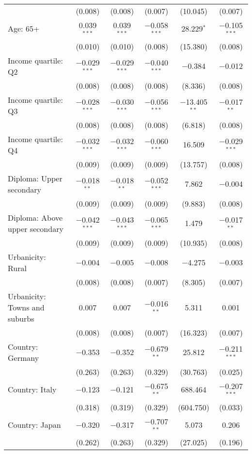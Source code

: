 \begin{tabular}{@{\extracolsep{5pt}}lccccc}
  & (0.008) & (0.008) & (0.007) & (10.045) & (0.007) \\ 
  Age: 65+ & 0.039$^{***}$ & 0.039$^{***}$ & $-$0.058$^{***}$ & 28.229$^{*}$ & $-$0.105$^{***}$ \\ 
  & (0.010) & (0.010) & (0.008) & (15.380) & (0.008) \\ 
  Income quartile: Q2 & $-$0.029$^{***}$ & $-$0.029$^{***}$ & $-$0.040$^{***}$ & $-$0.384 & $-$0.012 \\ 
  & (0.008) & (0.008) & (0.008) & (8.336) & (0.008) \\ 
  Income quartile: Q3 & $-$0.028$^{***}$ & $-$0.030$^{***}$ & $-$0.056$^{***}$ & $-$13.405$^{**}$ & $-$0.017$^{**}$ \\ 
  & (0.008) & (0.008) & (0.008) & (6.818) & (0.008) \\ 
  Income quartile: Q4 & $-$0.032$^{***}$ & $-$0.032$^{***}$ & $-$0.060$^{***}$ & 16.509 & $-$0.029$^{***}$ \\ 
  & (0.009) & (0.009) & (0.009) & (13.757) & (0.008) \\ 
  Diploma: Upper secondary & $-$0.018$^{**}$ & $-$0.018$^{**}$ & $-$0.052$^{***}$ & 7.862 & $-$0.004 \\ 
  & (0.009) & (0.009) & (0.009) & (9.883) & (0.008) \\ 
  Diploma: Above upper secondary & $-$0.042$^{***}$ & $-$0.043$^{***}$ & $-$0.065$^{***}$ & 1.479 & $-$0.017$^{**}$ \\ 
  & (0.009) & (0.009) & (0.009) & (10.935) & (0.008) \\ 
  Urbanicity: Rural & $-$0.004 & $-$0.005 & $-$0.008 & $-$4.275 & $-$0.003 \\ 
  & (0.008) & (0.008) & (0.007) & (8.305) & (0.007) \\ 
  Urbanicity: Towns and suburbs & 0.007 & 0.007 & $-$0.016$^{**}$ & 5.311 & 0.001 \\ 
  & (0.008) & (0.008) & (0.007) & (16.323) & (0.007) \\ 
  Country: Germany & $-$0.353 & $-$0.352 & $-$0.679$^{**}$ & 25.812 & $-$0.211$^{***}$ \\ 
  & (0.263) & (0.263) & (0.329) & (30.763) & (0.025) \\ 
  Country: Italy & $-$0.123 & $-$0.121 & $-$0.675$^{**}$ & 688.464 & $-$0.207$^{***}$ \\ 
  & (0.318) & (0.319) & (0.329) & (604.750) & (0.033) \\ 
  Country: Japan & $-$0.320 & $-$0.317 & $-$0.707$^{**}$ & 5.073 & 0.206 \\ 
  & (0.262) & (0.263) & (0.329) & (27.025) & (0.196) \\ 

\end{tabular}
